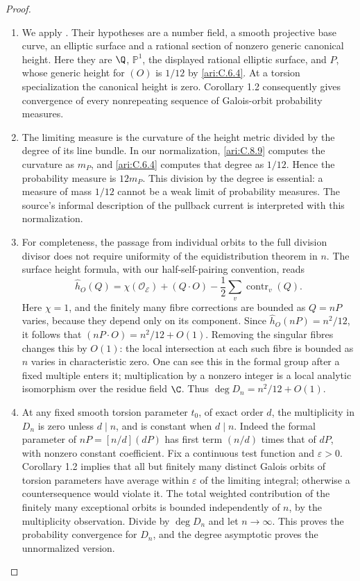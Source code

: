 \begin{proof}
\begin{enumerate}[label=\arabic*.,leftmargin=*]
\item We apply \citet[Theorem 1.1 and Corollary 1.2]{demarco2017}.
Their hypotheses are a number field, a smooth projective
base curve, an elliptic surface and a rational section of
nonzero generic canonical height. Here they are $\Q$,
$\mathbb P^1$, the displayed rational elliptic surface,
and $P$, whose generic height for $(O)$ is $1/12$ by \ref{ari:C.6.4}.
At a torsion specialization the canonical height is zero.
Corollary 1.2 consequently gives convergence of every
nonrepeating sequence of Galois-orbit probability measures.

\item The limiting measure is the curvature of the height metric
divided by the degree of its line bundle. In our normalization,
\ref{ari:C.8.9} computes the curvature as $m_P$, and \ref{ari:C.6.4} computes
that degree as $1/12$. Hence the probability measure is
$12m_P$. This division by the degree is essential: a measure
of mass $1/12$ cannot be a weak limit of probability measures.
The source's informal description of the pullback current
is interpreted with this normalization.

\item For completeness, the passage from individual orbits to
the full division divisor does not require uniformity of
the equidistribution theorem in $n$. The surface height
formula, with our half-self-pairing convention, reads
\[
 \widehat h_O(Q)=\chi(\mathcal O_{\mathcal E})+(Q\cdot O)
                -\frac12\sum_v\operatorname{contr}_v(Q).
\]
Here $\chi=1$, and the finitely many fibre corrections are
bounded as $Q=nP$ varies, because they depend only on its
component. Since $\widehat h_O(nP)=n^2/12$, it follows
that $(nP\cdot O)=n^2/12+O(1)$. Removing the singular fibres
changes this by $O(1)$: the local intersection at each
such fibre is bounded as $n$ varies in characteristic zero.
One can see this in the formal group after a fixed
multiple enters it; multiplication by a nonzero integer
is a local analytic isomorphism over the residue field
$\C$. Thus $\deg D_n=n^2/12+O(1)$.

\item At any fixed smooth torsion parameter $t_0$, of exact order
$d$, the multiplicity in $D_n$ is zero unless $d\mid n$,
and is constant when $d\mid n$. Indeed the formal parameter
of $nP=[n/d](dP)$ has first term $(n/d)$ times that of $dP$,
with nonzero constant coefficient. Fix a continuous test
function and $\varepsilon>0$. Corollary 1.2 implies that
all but finitely many distinct Galois orbits of torsion
parameters have average within $\varepsilon$ of the limiting
integral; otherwise a countersequence would violate it.
The total weighted contribution of the finitely many
exceptional orbits is bounded independently of $n$, by
the multiplicity observation. Divide by $\deg D_n$ and
let $n\to\infty$. This proves the probability convergence
for $D_n$, and the degree asymptotic proves the unnormalized
version.
\end{enumerate}
\end{proof}

